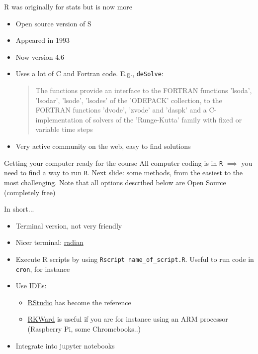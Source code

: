 \documentclass[aspectratio=169]{beamer}\usepackage[]{graphicx}\usepackage[]{xcolor}
\begin{document}
\begin{frame}{R was originally for stats but is now more}
\begin{itemize}
\item Open source version of S
\vfill
\item Appeared in 1993
\vfill
\item Now version 4.6
\vfill
\item Uses a lot of C and Fortran code. E.g., \texttt{deSolve}:
\begin{quote}
The functions provide an interface to the FORTRAN functions 'lsoda', 'lsodar', 'lsode', 'lsodes' of the 'ODEPACK' collection, to the FORTRAN functions 'dvode', 'zvode' and 'daspk' and a C-implementation of solvers of the 'Runge-Kutta' family with fixed or variable time steps
\end{quote}
\vfill
\item Very active community on the web, easy to find solutions \end{itemize}
\end{frame}

\begin{frame}{Getting your computer ready for the course}
All computer coding is in \texttt{R}
\vfill
$\implies$ you need to find a way to run \texttt{R}. Next slide: some methods, from the easiest to the most challenging.
\vfill
Note that all options described below are Open Source (completely free)
\end{frame}

\begin{frame}{In short...}
\begin{itemize}
\item Terminal version, not very friendly
\vfill
\item Nicer terminal: \href{https://github.com/randy3k/radian}{radian}
\vfill
\item Execute R scripts by using \texttt{Rscript name\_of\_script.R}. Useful to run code in \texttt{cron}, for instance
\vfill
\item Use IDEs:
    \begin{itemize}
    \item \href{https://www.rstudio.com/products/rstudio/}{RStudio} has become the reference
    \item \href{https://invent.kde.org/education/rkward}{RKWard} is useful if you are for instance using an ARM processor (Raspberry Pi, some Chromebooks..)
    \end{itemize}
\vfill
\item Integrate into jupyter notebooks
\end{itemize}
\end{frame}
\end{document}
